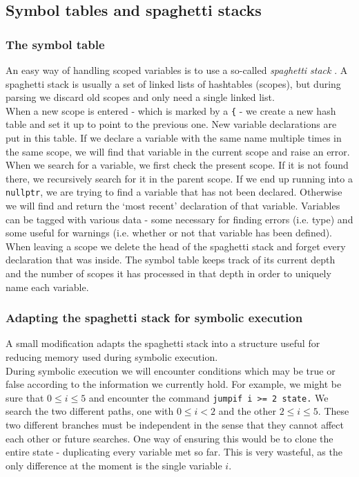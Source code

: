 \documentclass[12pt,a4paper]{article}
\begin{document}
\subsection{Symbol tables and spaghetti stacks} \label{app:spaghetti}
\subsubsection{The symbol table}
An easy way of handling scoped variables is to use a so-called \textit{spaghetti stack} \citep{dragon}. A spaghetti stack is usually a set of linked lists of hashtables (scopes), but during parsing we discard old scopes and only need a single linked list.\\
When a new scope is entered - which is marked by a \texttt{\{} - we create a new hash table and set it up to point to the previous one. New variable declarations are put in this table. If we declare a variable with the same name multiple times in the same scope, we will find that variable in the current scope and raise an error.\\
When we search for a variable, we first check the present scope. If it is not found there, we recursively search for it in the parent scope. If we end up running into a \texttt{nullptr}, we are trying to find a variable that has not been declared. Otherwise we will find and return the `most recent' declaration of that variable. Variables can be tagged with various data - some necessary for finding errors (i.e. type) and some useful for warnings (i.e. whether or not that variable has been defined).\\
When leaving a scope we delete the head of the spaghetti stack and forget every declaration that was inside. The symbol table keeps track of its current depth and the number of scopes it has processed in that depth in order to uniquely name each variable.

\subsubsection{Adapting the spaghetti stack for symbolic execution}
A small modification adapts the spaghetti stack into a structure useful for reducing memory used during symbolic execution.\\
During symbolic execution we will encounter conditions which may be true or false according to the information we currently hold. For example, we might be sure that $0 \leq i \leq 5$ and encounter the command \texttt{jumpif i >= 2 state.} We search the two different paths, one with $0 \leq i < 2$ and the other $2 \leq i \leq 5$. These two different branches must be independent in the sense that they cannot affect each other or future searches. One way of ensuring this would be to clone the entire state - duplicating every variable met so far. This is very wasteful, as the only difference at the moment is the single variable $i$.\par
\end{document}
